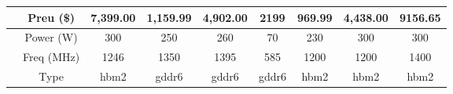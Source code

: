\begin{table}[H]
\begin{adjustwidth}{-1.0in}{-1.0in}
\begin{center}
{\begin{tabular}{cc||c|c|c|c|c|c|c}
& \cellcolor[HTML]{EFEFEF}Preu (\$)                                                     & \cellcolor[HTML]{EFEFEF}7,399.00                                & \cellcolor[HTML]{EFEFEF}1,159.99                                 & \cellcolor[HTML]{EFEFEF}4,902.00                                     & \cellcolor[HTML]{EFEFEF}2199                                  & \cellcolor[HTML]{EFEFEF}969.99                                       & \cellcolor[HTML]{EFEFEF}4,438.00                                       & \cellcolor[HTML]{EFEFEF}9156.65                                        \\
                                 \hline & {Power (W)}                                                                              & 300                                                             & 250                                                              & 260                                                                  & 70                                                            & 230                                                                  & 300                                                                    & 300                                                                    \\
                                 \hline
                                  & \cellcolor[HTML]{EFEFEF}Freq (MHz)                                                     & \cellcolor[HTML]{EFEFEF}1246                                    & \cellcolor[HTML]{EFEFEF}1350                                     & \cellcolor[HTML]{EFEFEF}1395                                         & \cellcolor[HTML]{EFEFEF}585                                   & \cellcolor[HTML]{EFEFEF}1200                                         & \cellcolor[HTML]{EFEFEF}1200                                           & \cellcolor[HTML]{EFEFEF}1400                                           \\ \hline
                                  & Type                                                                                   & hbm2                                                            & gddr6                                                            & gddr6                                                                & gddr6                                                         & hbm2                                                                 & hbm2                                                                   & hbm2                                                                   \\

\end{tabular}}
\end{center}
\end{adjustwidth}
\end{table}
